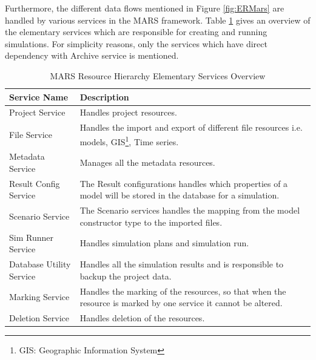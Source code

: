         \newpage
        Furthermore, the different data flows mentioned in Figure \ref{fig:ERMars} are handled by various services in the MARS framework. 
        Table \ref{table:MARS Resource Hierarchy Service Overview} gives an overview of the elementary services which are responsible for 
        creating and running simulations. For simplicity reasons, only the services
        which have direct dependency with Archive service is mentioned.
        \begin{table}[h!]
            \centering
            \begin{tabular}{|p{4cm}|p{10.5cm}|}
                \hline
                    \textbf{Service Name}  & \textbf{Description}\\
                \hline
                    Project Service & 
                    Handles project resources. \\
                \hline
                    File Service
                    & Handles the import and export of different file resources i.e. models, GIS\footnote{\label{footnote:GIS}GIS: Geographic Information System}, 
                    Time series.\\
                \hline
                    Metadata Service  & Manages all the metadata resources.\\
                \hline
                    Result Config Service  & The Result configurations handles which properties of a model will be stored in the database for a simulation.\\
                \hline
                    Scenario Service  & The Scenario services handles the mapping from the model constructor type to the imported files.\\
                \hline
                    Sim Runner Service  & Handles simulation plans and simulation run.\\
                \hline
                    Database Utility Service  & Handles all the simulation results and is responsible to backup the project data.\\
                \hline
                    Marking Service  & Handles the marking of the resources, so that when the resource is marked by one service it cannot be altered.\\
                \hline
                    Deletion Service  & Handles deletion of the resources.\\
                \hline
            \end{tabular}
            \caption{MARS Resource Hierarchy Elementary Services Overview}
            \label{table:MARS Resource Hierarchy Service Overview}     
        \end{table}    